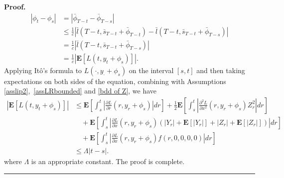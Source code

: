\documentclass[10pt]{article}%
\numberwithin{equation}{section}
\newenvironment{proof}[1][Proof]{\noindent \textbf{#1.} }{\  \rule{0.5em}{0.5em}}
\begin{document}
\begin{proof}
\begin{equation}
\begin{split}
    \left|\phi_{t}-\phi_{s}\right|&=\left|\bar{\phi}_{T-t}-\bar{\phi}_{T-s}\right|\\
    &\leq  \frac{1}{c}\left|\bar{l}(T-t,\bar{s}_{T-t}+\bar{\phi}_{T-t})-\bar{l}(T-t,\bar{s}_{T-t}+\bar{\phi}_{T-s})\right|\\
    &=\frac{1}{c}\left|\bar{l}(T-t,\bar{s}_{T-t}+\bar{\phi}_{T-s})\right|\\
    &=\frac{1}{c}\left|\mathbf{E}\left[L(t,y_{t}+\phi_{s})\right]\right|.
\end{split}    
\end{equation}
Applying It\^o's  formula to $L(\cdot,y_{\cdot}+\phi_{s})$ on the interval $[s,t]$ and then taking expectations on both sides of the equation, combining with Assumptions \ref{asslip2},\ \ref{assLRbounded} and \eqref{bdd of Z}, we have
\begin{equation}
\begin{split}
  \left|\mathbf{E}\left[L(t,y_{t}+\phi_{s})\right]\right|&\leq  \mathbf{E}\left[\int_{s}^{t}\left|\frac{\partial L}{\partial r}(r,y_{r}+\phi_{s})\right|dr\right]+\frac{1}{2}\mathbf{E}\left[\int_{s}^{t}\left|\frac{\partial^2 L}{\partial x^2}(r,y_{r}+\phi_{s})Z_r^2\right|dr\right]\\ 
  &\quad+\mathbf{E}\left[\int_{s}^{t}\left|\frac{\partial L}{\partial x}(r,y_{r}+\phi_{s})\left(|Y_r|+\mathbf{E}[|Y_r|]+|Z_r|+\mathbf{E}[|Z_r|]\right)\right|dr\right]\\
  &\quad+\mathbf{E}\left[\int_{s}^{t}\left|\frac{\partial L}{\partial x}(r,y_{r}+\phi_{s})f(r,0,0,0,0)\right|dr\right]\\
  &\leq \Lambda |t-s|.
\end{split}
\end{equation}
where $\Lambda$ is an appropriate constant.
The proof is complete. %
\end{proof}
\end{document}
